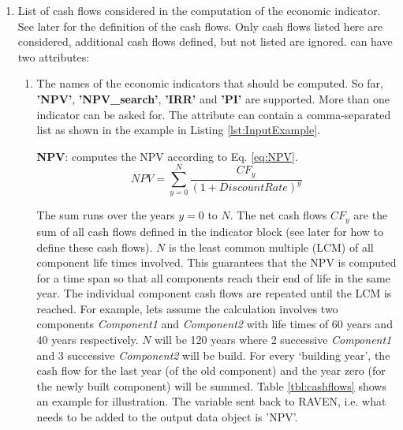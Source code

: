 \begin{enumerate}
\item[\xmlNode{Indicator}] List of cash flows considered in the computation of the economic indicator. See later for the definition
 of the cash flows. Only cash flows listed here are considered, additional cash flows defined, but not listed are ignored.
 can have two attributes:
  \begin{enumerate}
  \item[\xmlAttr{name}] The names of the economic indicators that should be computed. So far, \textbf{'NPV'}, \textbf{'NPV\_search'}, \textbf{'IRR'} and \textbf{'PI'} are supported. More than one indicator can be asked for.
The  attribute can contain a comma-separated list as shown in the example in Listing \ref{lst:InputExample}.

\textbf{NPV}: computes the NPV according to Eq. \ref{eq:NPV}.
\begin{equation}\label{eq:NPV}
NPV=\sum_{y=0}^{N}\frac{CF_{y}}{(1+DiscountRate)^{y}}
\end{equation}

The sum runs over the years $y=0$ to $N$. The net cash flows $CF_{y}$ are the sum of all cash flows defined in the indicator block (see later for how to define these cash flows).
$N$ is the least common multiple (LCM) of all component life times involved. This guarantees that the NPV is computed for a time span so that all components reach their end of life in the same year.
The individual component cash flows are repeated until the LCM is reached. For example, lets assume the calculation involves two components \textit{Component1} and \textit{Component2}
 with life times of 60 years and 40 years respectively. $N$ will be 120 years where 2 successive \textit{Component1} and 3 successive \textit{Component2} will be build. For every ‘building year’,
the cash flow for the last year (of the old component) and the year zero (for the newly built component) will be summed. Table \ref{tbl:cashflows} shows an example for illustration.
The variable sent back to RAVEN, i.e. what needs to be added to the output data object is 'NPV'.


\end{enumerate}
\end{enumerate}
